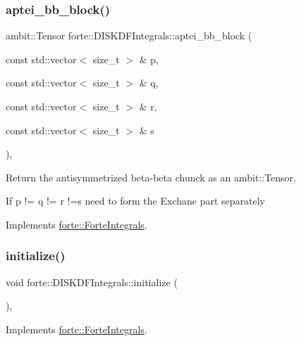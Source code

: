 \subsubsection{\texorpdfstring{aptei\+\_\+bb\+\_\+block()}{aptei\_bb\_block()}}
{\footnotesize\ttfamily ambit\+::\+Tensor forte\+::\+D\+I\+S\+K\+D\+F\+Integrals\+::aptei\+\_\+bb\+\_\+block (\begin{DoxyParamCaption}\item[{const std\+::vector$<$ size\+\_\+t $>$ \&}]{p,  }\item[{const std\+::vector$<$ size\+\_\+t $>$ \&}]{q,  }\item[{const std\+::vector$<$ size\+\_\+t $>$ \&}]{r,  }\item[{const std\+::vector$<$ size\+\_\+t $>$ \&}]{s }\end{DoxyParamCaption})\hspace{0.3cm}{\ttfamily [override]}, {\ttfamily [virtual]}}



Return the antisymmetrized beta-\/beta chunck as an ambit\+::\+Tensor. 

If p != q != r !=s need to form the Exchane part separately 

Implements \mbox{\hyperlink{classforte_1_1_forte_integrals_ae2799dc7cbfd456603a2b841b26582ab}{forte\+::\+Forte\+Integrals}}.

\mbox{\label{classforte_1_1_d_i_s_k_d_f_integrals_a3205b9dc431a7104969132b1f4bc206f}} 
\subsubsection{\texorpdfstring{initialize()}{initialize()}}
{\footnotesize\ttfamily void forte\+::\+D\+I\+S\+K\+D\+F\+Integrals\+::initialize (\begin{DoxyParamCaption}{ }\end{DoxyParamCaption})\hspace{0.3cm}{\ttfamily [override]}, {\ttfamily [virtual]}}



Implements \mbox{\hyperlink{classforte_1_1_forte_integrals_a7862835fa0f5f9abe13dfcd6730fa4be}{forte\+::\+Forte\+Integrals}}.

